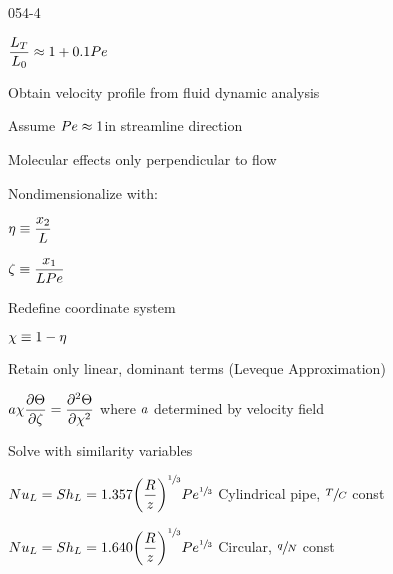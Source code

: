 \begin{mitframe}{054-4}
		\begin{listone}
        		\item $\dfrac{\length_{\Temp}}{\length_{0}}\approx{1}+0.1\peclet$
                \item Obtain velocity profile from fluid dynamic analysis
                \item Assume $\peclet\approx{1}$in streamline direction
                \begin{listtwo}
                	\item Molecular effects only perpendicular to flow 
                \end{listtwo}
        \item Nondimensionalize with:
        		\begin{listtwo}
                		\item $\intrinsvisc\equiv\dfrac{\specfrac{2}}{\length}$
                        \item $\zeta\equiv\dfrac{\specfrac{1}}{\length\peclet}$
                        
                \end{listtwo}
        \item Redefine coordinate system
        		\begin{listtwo}
                		\item $\fhparam\equiv{1}-\intrinsvisc$
                 \end{listtwo}
        		\item Retain only linear, dominant terms (Leveque Approximation)
                	\begin{listtwo}
                    		\item $\activity\fhparam\dfrac{\partial\dimltemp}{\partial\zeta}=\dfrac{\partial^2\dimltemp}{\partial\fhparam^2}$ where $\activity$ determined by velocity field
                           
                    \end{listtwo}
        \item Solve with similarity variables
        \item $\nusselt_{\length}=\sherwood_{\length}=1.357\bigg(\dfrac{\gasconst}{z}\bigg)^{\sfrac{1}{3}} \peclet^{\sfrac{1}{3}}$ Cylindrical pipe, $\sfrac{\Temp}{\conc}$ const
        \item $\nusselt_{\length}=\sherwood_{\length}=1.640\bigg(\dfrac{\gasconst}{z}\bigg)^{\sfrac{1}{3}}\peclet^{\sfrac{1}{3}}$ Circular, $\sfrac{\heatflux}{\nummoles}$ const
        \end{listone}    
\end{mitframe}